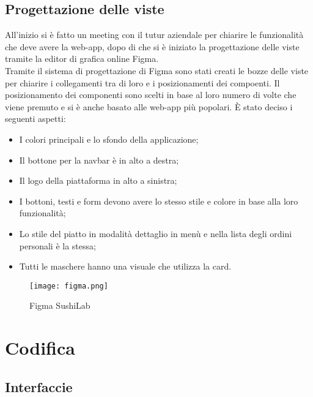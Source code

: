 \subsection{Progettazione delle viste}
All'inizio si è fatto un meeting\gl{} con il tutur aziendale per chiarire le funzionalità che deve avere la web-app, dopo di che si è iniziato la progettazione delle viste tramite la editor di grafica online\gl{} Figma\gl{}.\\
Tramite il sistema di progettazione di Figma sono stati creati le bozze delle viste per chiarire i collegamenti tra di loro e i posizionamenti dei compoenti. 
Il posizionamento dei componenti sono scelti in base al loro numero di volte che viene premuto e si è anche basato alle web-app più popolari.
È stato deciso i seguenti aspetti:
\begin{itemize}
    \item I colori principali e lo sfondo della applicazione;
    \item Il bottone per la navbar\gl{} è in alto a destra;
    \item Il logo della piattaforma in alto a sinistra;
    \item I bottoni, testi e form devono avere lo stesso stile e colore in base alla loro funzionalità;
    \item Lo stile del piatto in modalità dettaglio in menù e nella lista degli ordini personali è la stessa;
    \item Tutti le maschere hanno una visuale che utilizza la card.
\end{itemize}
\begin{figure}[H]
    \centering
    \texttt{[image: figma.png]}
    \caption{Figma SushiLab}
\end{figure}


\section{Codifica}
\subsection{Interfaccie}
